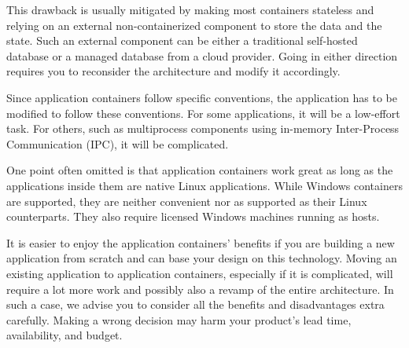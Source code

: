 This drawback is usually mitigated by making most containers stateless and relying on an external non-containerized component to store the data and the state. Such an external component can be either a traditional self-hosted database or a managed database from a cloud provider. Going in either direction requires you to reconsider the architecture and modify it accordingly.

Since application containers follow specific conventions, the application has to be modified to follow these conventions. For some applications, it will be a low-effort task. For others, such as multiprocess components using in-memory Inter-Process Communication (IPC), it will be complicated.

One point often omitted is that application containers work great as long as the applications inside them are native Linux applications. While Windows containers are supported, they are neither convenient nor as supported as their Linux counterparts. They also require licensed Windows machines running as hosts.

It is easier to enjoy the application containers' benefits if you are building a new application from scratch and can base your design on this technology. Moving an existing application to application containers, especially if it is complicated, will require a lot more work and possibly also a revamp of the entire architecture. In such a case, we advise you to consider all the benefits and disadvantages extra carefully. Making a wrong decision may harm your product's lead time, availability, and budget.














